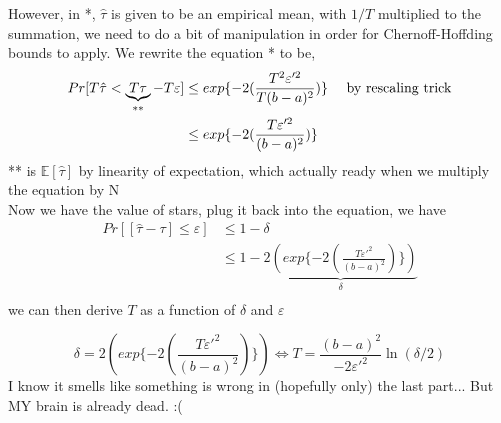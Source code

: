 \documentclass[a4paper, 11pt]{article}
\begin{document}
\begin{itemize}
However, in *, $\hat{\tau}$ is given to be an empirical mean, with $1/T$ multiplied to the summation, we need to do a bit of manipulation in order for Chernoff-Hoffding bounds to apply. We rewrite the equation * to be,
\begin{align*}
Pr[ T\hat{\tau} < \underbrace{T\tau}_{**}-T\varepsilon ] & \leq exp\{-2(\frac{T^2\varepsilon'^2}{T(b-a)^2})\}  && \textmd{ by rescaling trick}\\
&\leq  exp\{-2(\frac{T\varepsilon'^2}{(b-a)^2})\} 
\end{align*}
** is $\mathbb{E}[\hat{\tau}]$ by linearity of expectation, which actually ready when we multiply the equation by N\\
Now we have the value of stars, plug it back into the equation, we have
\begin{align*}
Pr[[\hat{\tau}-\tau] \leq \varepsilon ] &\leq 1-\delta\\
&\leq 1 - \underbrace{2(exp\{-2(\frac{T\varepsilon'^2}{(b-a)^2})\} )}_{\delta} \\
\end{align*}
we can then derive $T$ as a function of $\delta$ and $\varepsilon$ 

$$\delta = 2(exp\{-2(\frac{T\varepsilon'^2}{(b-a)^2})\} )
\Leftrightarrow
T =  \frac{(b-a)^2}{-2 \varepsilon'^2} \ln (\delta/2)$$
I know it smells like  something is wrong in (hopefully only)  the last part... But MY brain is already dead. :(

\end{itemize}
\end{document}
